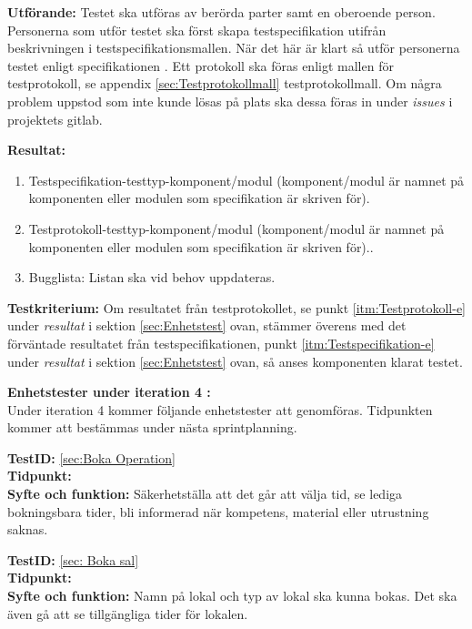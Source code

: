 \documentclass[a4paper,10pt, twoside]{article}
\begin{document}
  \textbf{Utförande:} Testet ska utföras av berörda parter samt en oberoende person. Personerna som 		utför testet ska först skapa testspecifikation utifrån beskrivningen i testspecifikationsmallen. 		När det här är klart så utför personerna testet enligt specifikationen \cite{kravspec}. Ett 			protokoll ska föras enligt mallen för testprotokoll, se appendix \ref{sec:Testprotokollmall} 			testprotokollmall. Om några problem uppstod som inte kunde lösas på plats ska dessa föras in under \emph{issues} i projektets gitlab.

  \textbf{Resultat:}
    \begin{enumerate}
      \item \label{itm:Testspecifikation-e} Testspecifikation-testtyp-komponent/modul (komponent/modul 			är namnet på komponenten eller modulen som specifikation är skriven för).
      \item \label{itm:Testprotokoll-e} Testprotokoll-testtyp-komponent/modul (komponent/modul är 					namnet på komponenten eller modulen som specifikation
       är skriven för)..
      \item Bugglista: Listan ska vid behov uppdateras.
    \end{enumerate}

   \textbf{Testkriterium:} Om resultatet från testprotokollet, se punkt \ref{itm:Testprotokoll-e} under      	\emph{resultat} i sektion \ref{sec:Enhetstest}
   ovan, stämmer överens med det förväntade resultatet från testspecifikationen, punkt \ref{itm:Testspecifikation-e} under \emph{resultat} i sektion
  \ref{sec:Enhetstest} ovan, så anses komponenten klarat testet.

  \textbf{Enhetstester under iteration 4 :}
  \\  Under iteration 4 kommer följande enhetstester att genomföras. Tidpunkten kommer att bestämmas 
  under nästa sprintplanning.

  \textbf{TestID:} \ref{sec:Boka Operation} 
  \\ \textbf{Tidpunkt:}
  \\ \textbf{Syfte och funktion:} Säkerhetställa att det går att välja tid, se lediga bokningsbara 			 tider, bli informerad när kompetens, material eller utrustning saknas.
  

  \textbf{TestID:} \ref{sec: Boka sal} 
  \\ \textbf{Tidpunkt:}
  \\ \textbf{Syfte och funktion:} Namn på lokal och typ av lokal ska kunna bokas. Det ska även gå att se tillgängliga tider för lokalen.
\end{document}
